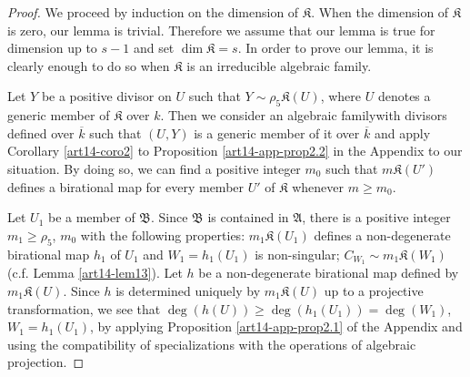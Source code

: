 \begin{proof}
We proceed by induction on the dimension of $\mathfrak{K}$. When the dimension of $\mathfrak{K}$ is zero, our lemma is trivial. Therefore we assume that our lemma is true for dimension up to $s-1$ and set $\dim \mathfrak{K}=s$. In order to prove our lemma, it is clearly enough to do so when $\mathfrak{K}$ is an irreducible algebraic family.

Let $Y$ be a positive divisor on $U$ such that $Y\sim \rho_{5}\mathfrak{K}(U)$, where $U$ denotes a generic member of $\mathfrak{K}$ over $k$. Then we consider an algebraic family\pageoriginale with divisors defined over $\overline{k}$ such that $(U,Y)$ is a generic member of it over $\overline{k}$ and apply Corollary \ref{art14-coro2} to Proposition \ref{art14-app-prop2.2} in the Appendix to our situation. By doing so, we can find a positive integer $m_{0}$ such that $m\mathfrak{K}(U')$ defines a birational map for every member $U'$ of $\mathfrak{K}$ whenever $m\geq m_{0}$.


Let $U_{1}$ be a member of $\mathfrak{B}$. Since $\mathfrak{B}$ is contained in $\mathfrak{A}$, there is a positive integer $m_{1}\geq \rho_{5}$, $m_{0}$ with the following properties: $m_{1}\mathfrak{K}(U_{1})$ defines a non-degenerate birational map $h_{1}$ of $U_{1}$ and $W_{1}=h_{1}(U_{1})$ is non-singular; $C_{W_{1}}\sim m_{1}\mathfrak{K}(W_{1})$ (c.f. Lemma \ref{art14-lem13}). Let $h$ be a non-degenerate birational map defined by $m_{1}\mathfrak{K}(U)$. Since $h$ is determined uniquely by $m_{1}\mathfrak{K}(U)$ up to a projective transformation, we see that $\deg(h(U))\geq \deg(h_{1}(U_{1}))=\deg (W_{1})$, $W_{1}=h_{1}(U_{1})$, by applying Proposition \ref{art14-app-prop2.1} of the Appendix and using the compatibility of specializations with the operations of algebraic projection.


\end{proof}
